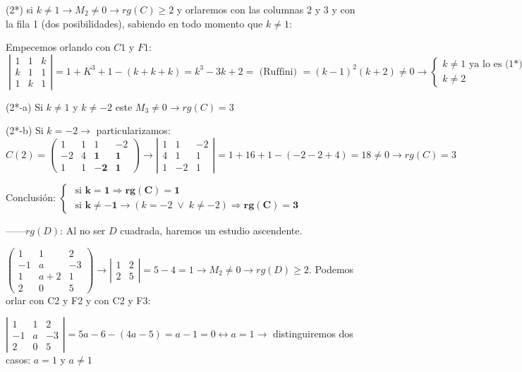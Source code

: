 \begin{proofw}
(2*) si $k \neq 1 \to  M_2\neq 0 \to rg(C)\ge 2$ y orlaremos con las columnas 2 y 3 y con la fila 1 (dos posibilidades), sabiendo en todo momento que $k \neq 1 $: 

Empecemos orlando con $C1$ y $F1$: $\; \left| \begin{matrix} 1&1&k\\k&1&1\\1&k&1 \end{matrix} \right|= 1+K^3+1-(k+k+k)=k^3-3k+2=\text{ (Ruffini) }=(k-1)^2(k+2) \neq 0 \to \begin{cases} k\neq 1 \text{ ya lo es (1*) }\\ k\neq 2 \end{cases} \to $

(2*-a) Si $k\neq 1$ y $k\neq -2$ este $M_3\neq 0 \to rg(C)=3$

(2*-b) Si $k=-2 \to$ particularizamos: $C(2)=\left( \begin{matrix} 1&1&1&-2\\-2&4&\boldsymbol{1}&\boldsymbol{1}\\1&1&\boldsymbol{-2}&\boldsymbol{1} \end{matrix} \right) \to \left| \begin{matrix} 1&1&-2\\4&1&1\\1&-2&1 \end{matrix} \right| = 1+16+1-(-2-2+4)=18\neq 0 \to rg(C)=3$

Conclusión: $\begin{cases} \text{ si } \boldsymbol{k=1} \Rightarrow \boldsymbol{rg(C)=1 } \\  \text{ si } \boldsymbol{k\neq -1} \to (k=-2\; \vee \; k\neq -2) \Rightarrow \boldsymbol{rg(C)=3} \end{cases}$
	

------$rg(D)$: Al no ser $D$ cuadrada, haremos un estudio ascendente.

$\left( \begin{matrix} \boxed{1}&1& \boxed{2}\\-1&a&-3\\1&a+2&1\\ \boxed{2}&0& \boxed{5}  \end{matrix} \right) \to \left| \begin{matrix} 1&2\\2&5 \end{matrix} \right| = 5-4=1 \to M_2\neq 0 \to rg(D)\ge 2$. Podemos orlar con C2 y F2 y con C2 y F3:

$\left| \begin{matrix} 1&1&2\\-1&a&-3\\2&0&5 \end{matrix} \right|= 5a-6-(4a-5)=a-1=0 \leftrightarrow a=1 \to $ distinguiremos dos casos: $a=1$ y $a\neq 1$


\end{proofw}
